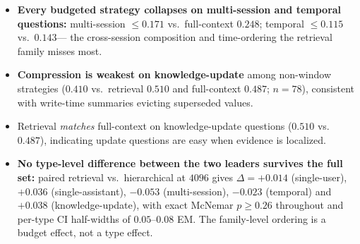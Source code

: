 \documentclass{article} %
\begin{document}
\begin{table}[h]
\centering\scriptsize
\caption{Strict EM by question-type family (all budgets pooled per policy; full-context from
its single run; $n{=}500$). Single-preference questions are open-ended and score $0.000$ for
every policy under exact match, so the three single-session types are pooled. Source
\texttt{tables500/bytype.tex}.}
\label{tab:bytype}

\end{table}

\begin{itemize}\setlength{\itemsep}{1pt}
\item \textbf{Every budgeted strategy collapses on multi-session and temporal questions:}
multi-session $\leq 0.171$ vs.\ full-context $0.248$; temporal $\leq 0.115$ vs.\ $0.143$---
the cross-session composition and time-ordering the retrieval family misses most.
\item \textbf{Compression is weakest on knowledge-update} among non-window strategies
($0.410$ vs.\ retrieval $0.510$ and full-context $0.487$; $n{=}78$), consistent with
write-time summaries evicting superseded values.
\item Retrieval \emph{matches} full-context on knowledge-update questions ($0.510$ vs.\
$0.487$), indicating update questions are easy when evidence is localized.
\item \textbf{No type-level difference between the two leaders survives the full set:}
paired retrieval vs.\ hierarchical at $4096$ gives $\Delta{=}+0.014$ (single-user),
$+0.036$ (single-assistant), $-0.053$ (multi-session), $-0.023$ (temporal) and $+0.038$
(knowledge-update), with exact McNemar $p \geq 0.26$ throughout and per-type CI half-widths
of $0.05$--$0.08$ EM. The family-level ordering is a budget effect, not a type effect.
\end{itemize}

\begin{table}[htbp]
\centering\scriptsize
\caption{Per-type, per-budget paired comparison, hierarchical minus retrieval (relaxed EM,
exact McNemar; $^{**}p{<}0.01$, $^{*}p{<}0.05$; primary reader, full set). The significant
retrieval edge lives at small budgets and on single-session / multi-session questions; from
$B{=}2048$ on, no family differs significantly and multi-session / temporal tilt (n.s.)\ toward
hierarchical at $4096$. Source \texttt{tables500/type\_paired.tex}
(regenerated by \texttt{type\_paired.py} from \texttt{results.jsonl}).}
\label{tab:typepaired}

\end{table}
\end{document}
